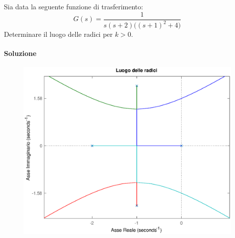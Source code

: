 \begin{esercizio}
Sia data la seguente funzione di trasferimento:
\[
	G(s) = \frac{1}{s(s+2)\bigl( (s+1)^2 +4 \bigr)}
\]
Determinare il luogo delle radici per \(k>0\).

\paragraph{Soluzione}

\begin{figure}[ht]
	\centering
	\includegraphics[scale=.6]{mod1/assets/rl_ex37}
\end{figure}


\end{esercizio}

